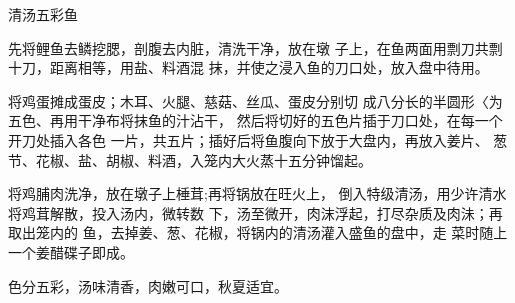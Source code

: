 \begin{recipe}[麒麟鱼]{清汤五彩鱼}

\ingredients


\cooking

\step 	先将鲤鱼去鳞挖腮，剖腹去内脏，清洗干净，放在墩 子上，在鱼两面用剽刀共剽十刀，距离相等，用盐、料酒混 抹，并使之浸入鱼的刀口处，放入盘中待用。

\step 	将鸡蛋摊成蛋皮；木耳、火腿、慈菇、丝瓜、蛋皮分别切 成八分长的半圆形〈为五色、再用干净布将抹鱼的汁沾干， 然后将切好的五色片插于刀口处，在每一个开刀处插入各色 一片，共五片；插好后将鱼腹向下放于大盘内，再放入姜片、 葱节、花椒、盐、胡椒、料酒，入笼内大火蒸十五分钟馏起。

将鸡脯肉洗净，放在墩子上棰茸;再将锅放在旺火上， 倒入特级清汤，用少许清水将鸡茸解散，投入汤内，微转数 下，汤至微开，肉沫浮起，打尽杂质及肉沬；再取出笼内的 鱼，去掉姜、葱、花椒，将锅内的清汤灌入盛鱼的盘中，走 菜时随上一个姜醋碟子即成。

\notes

色分五彩，汤味清香，肉嫩可口，秋夏适宜。

\end{recipe}

